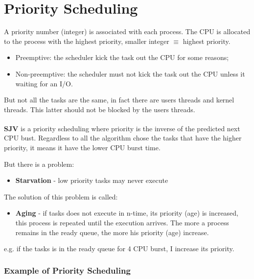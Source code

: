 \newpage
\section{Priority Scheduling}

A priority number (integer) is associated with each process. The CPU  is allocated to the process with the highest priority, smaller integer $\equiv$ highest priority.

\begin{itemize}
    \item Preemptive: the scheduler kick the task out the CPU for some reasons;
    \item Non-preemptive: the scheduler must not kick the task out the CPU unless it waiting for an I/O.
\end{itemize}

But not all the tasks are the same, in fact there are users threads and kernel threads. This latter should not be blocked by the users threads.

\paragraph{}
\textbf{SJV} is a priority scheduling where priority is the inverse of the predicted next CPU bust. Regardless to all the algorithm chose the tasks that have the higher priority, it means it have the lower CPU burst time.


But there is a problem:

\begin{itemize}
    \item[] \textbf{Starvation} - low priority tasks may never execute
\end{itemize}

The solution of this problem is called:

\begin{itemize}
    \item[] \textbf{Aging} - if tasks does not execute in n-time, its priority (age) is increased, this process is repeated until the execution arrives. The more a process remains in the ready queue, the more his priority (age) increase.
\end{itemize}

e.g. if the tasks is in the ready queue for 4 CPU burst, I increase its priority.

\subsubsection{Example of Priority Scheduling}

